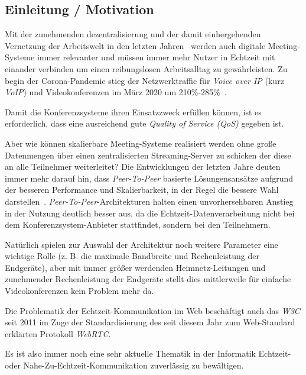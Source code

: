 \documentclass{article}
\begin{document}
\begin{onecolumn}

\section{Einleitung / Motivation}

Mit der zunehmenden dezentralisierung und der damit einhergehenden Vernetzung
der Arbeitswelt in den letzten Jahren~\cite{CoronaHomeOffice} werden auch
digitale Meeting-Systeme immer relevanter und müssen immer mehr Nutzer in
Echtzeit mit einander verbinden um einen reibungslosen Arbeitsalltag zu
gewährleisten. Zu begin der Corona-Pandemie stieg der Netzwerktraffic für
\textit{Voice over IP} (kurz \textit{VoIP}) und Videokonferenzen im März 2020
um 210\%-285\%~\cite{NetzwerkStatistik}.

Damit die Konferenzsysteme ihren Einsatzzweck erfüllen können, ist es
erforderlich, dass eine ausreichend gute \textit{Quality of Service (QoS)}
gegeben ist.

Aber wie können skalierbare Meeting-Systeme realisiert werden ohne große
Datenmengen über einen zentralisierten Streaming-Server zu schicken der diese
an alle Teilnehmer weiterleitet? Die Entwicklungen der letzten Jahre deuten
immer mehr darauf hin, dass \textit{Peer-To-Peer} basierte Lösungensansätze
aufgrund der besseren Performance und Skalierbarkeit, in der Regel die bessere
Wahl darstellen~\cite{PeerToPeerVersusCentralized}.
\textit{Peer-To-Peer}-Architekturen halten einen unvorhersehbaren Anstieg in
der Nutzung deutlich besser aus, da die Echtzeit-Datenverarbeitung nicht bei
dem Konferenzsystem-Anbieter stattfindet, sondern bei den Teilnehmern.

Natürlich spielen zur Auswahl der Architektur noch weitere Parameter eine
wichtige Rolle (z. B. die maximale Bandbreite und Rechenleistung der
Endgeräte), aber mit immer größer werdenden Heimnetz-Leitungen und zunehmender
Rechenleistung der Endgeräte stellt dies mittlerweile für einfache
Videokonferenzen kein Problem mehr da.~\cite{VideokonferenzNetzwerklast}

Die Problematik der Echtzeit-Kommunikation im Web beschäftigt auch
das \textit{W3C} seit 2011 im Zuge der Standardisierung des seit diesem Jahr
zum Web-Standard erklärten Protokoll \textit{WebRTC}.~\cite{WebRTCStandardW3C}

Es ist also immer noch eine sehr aktuelle Thematik in der Informatik
Echtzeit- oder Nahe-Zu-Echtzeit-Kommunikation zuverlässig zu bewältigen.


\end{onecolumn}
\end{document}
